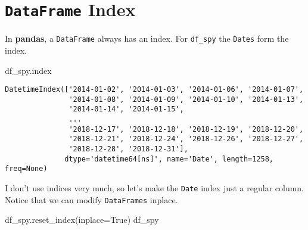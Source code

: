 \documentclass[
  letterpaper,
  DIV=11,
  numbers=noendperiod]{scrreprt}
\newenvironment{Shaded}{\begin{snugshade}}{\end{snugshade}}
\newcommand{\NormalTok}[1]{\textcolor[rgb]{0.00,0.23,0.31}{#1}}
\newcommand{\OperatorTok}[1]{\textcolor[rgb]{0.37,0.37,0.37}{#1}}
\newcommand{\VariableTok}[1]{\textcolor[rgb]{0.07,0.07,0.07}{#1}}
\begin{document}
\hypertarget{dataframe-index}{%
\section{\texorpdfstring{\texttt{DataFrame}
Index}{DataFrame Index}}\label{dataframe-index}}

In \textbf{pandas}, a \texttt{DataFrame} always has an index. For
\texttt{df\_spy} the \texttt{Dates} form the index.

\begin{Shaded}
\begin{Highlighting}[]
\NormalTok{df\_spy.index}
\end{Highlighting}
\end{Shaded}

\begin{verbatim}
DatetimeIndex(['2014-01-02', '2014-01-03', '2014-01-06', '2014-01-07',
               '2014-01-08', '2014-01-09', '2014-01-10', '2014-01-13',
               '2014-01-14', '2014-01-15',
               ...
               '2018-12-17', '2018-12-18', '2018-12-19', '2018-12-20',
               '2018-12-21', '2018-12-24', '2018-12-26', '2018-12-27',
               '2018-12-28', '2018-12-31'],
              dtype='datetime64[ns]', name='Date', length=1258, freq=None)
\end{verbatim}

I don't use indices very much, so let's make the \texttt{Date} index
just a regular column. Notice that we can modify \texttt{DataFrames}
inplace.

\begin{Shaded}
\begin{Highlighting}[]
\NormalTok{df\_spy.reset\_index(inplace}\OperatorTok{=}\VariableTok{True}\NormalTok{)}
\NormalTok{df\_spy}
\end{Highlighting}
\end{Shaded}
\end{document}
